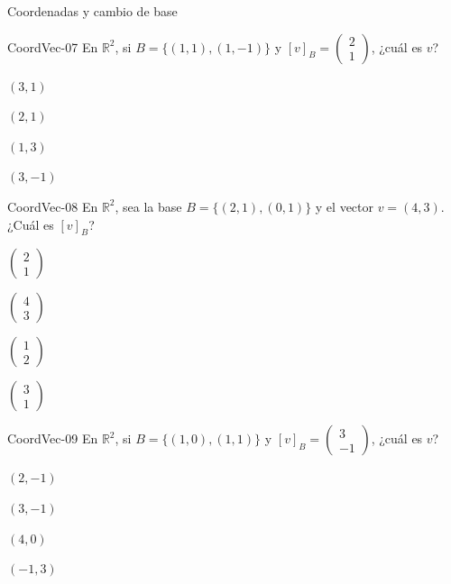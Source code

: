 \documentclass[a4,11pt]{aleph-notas}
\begin{document}
\begin{quiz}{Coordenadas y cambio de base}
\begin{multi}[]%
    {CoordVec-07}
    En \(\mathbb{R}^2\), si \(B=\{(1,1),(1,-1)\}\) y \([v]_B=\begin{pmatrix}2\\1\end{pmatrix}\), ¿cuál es \(v\)?
    \item* \((3,1)\)
    \item \((2,1)\)
    \item \((1,3)\)
    \item \((3,-1)\)
\end{multi}

\begin{multi}[]%
    {CoordVec-08}
    En \(\mathbb{R}^2\), sea la base \(B=\{(2,1),(0,1)\}\) y el vector \(v=(4,3)\). ¿Cuál es \([v]_B\)?
    \item* \(\begin{pmatrix}2\\1\end{pmatrix}\)
    \item \(\begin{pmatrix}4\\3\end{pmatrix}\)
    \item \(\begin{pmatrix}1\\2\end{pmatrix}\)
    \item \(\begin{pmatrix}3\\1\end{pmatrix}\)
\end{multi}

\begin{multi}[]%
    {CoordVec-09}
    En \(\mathbb{R}^2\), si \(B=\{(1,0),(1,1)\}\) y \([v]_B=\begin{pmatrix}3\\-1\end{pmatrix}\), ¿cuál es \(v\)?
    \item* \((2,-1)\)
    \item \((3,-1)\)
    \item \((4,0)\)
    \item \((-1,3)\)
\end{multi}


\end{quiz}
\end{document}
